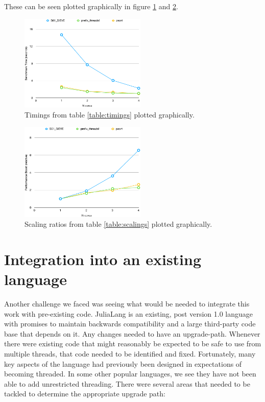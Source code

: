 \documentclass{juliacon}
\begin{document}
These can be seen plotted graphically in figure \ref{fig:timings} and \ref{fig:scalings}.

\begin{figure}[ht]
\centerline{\includegraphics[width=6cm]{images/threads_timing.pdf}}
\caption{Timings from table \ref{table:timings} plotted graphically.}
\label{fig:timings}
\end{figure}

\begin{figure}[ht]
\centerline{\includegraphics[width=6cm]{images/threads_scaling.pdf}}
\caption{Scaling ratios from table \ref{table:scalings} plotted graphically.}
\label{fig:scalings}
\end{figure}

\section{Integration into an existing language}
\label{subsub:integration}

Another challenge we faced was seeing what would be needed to integrate this work with pre-existing code. JuliaLang is an existing, post version 1.0 language with promises to maintain backwards compatibility and a large third-party code base that depends on it. Any changes needed to have an upgrade-path. Whenever there were existing code that might reasonably be expected to be safe to use from multiple threads, that code needed to be identified and fixed. Fortunately, many key aspects of the language had previously been designed in expectations of becoming threaded. In some other popular languages, we see they have not been able to add unrestricted threading. There were several areas that needed to be tackled to determine the appropriate upgrade path:
\end{document}
